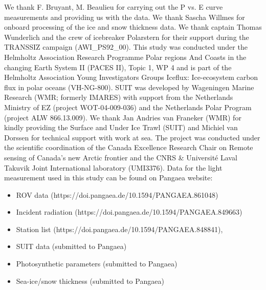 \documentclass[draft]{agujournal2018}
\begin{document}
%
%
%
%
%
%
%
%

\acknowledgments

We thank F. Bruyant, M. Beaulieu for carrying out the P vs. E curve measurements and providing us with the data. We thank Sascha Willmes for onboard processing of the ice and snow thickness data. We thank captain Thomas Wunderlich and the crew of icebreaker Polarstern for their support during the TRANSSIZ campaign (AWI\_PS92\_00). This study was conducted under the Helmholtz Association Research Programme Polar regions And Coasts in the changing Earth System II (PACES II), Topic 1, WP 4 and is part of the Helmholtz Association Young Investigators Groups Iceflux: Ice-ecosystem carbon flux in polar oceans (VH-NG-800). SUIT was developed by Wageningen Marine Research (WMR; formerly IMARES) with support from the Netherlands Ministry of EZ (project WOT-04-009-036) and the Netherlands Polar Program (project ALW 866.13.009). We thank Jan Andries van Franeker (WMR) for kindly providing the Surface and Under Ice Trawl (SUIT) and Michiel van Dorssen for technical support with work at sea. The project was conducted under the scientific coordination of the Canada Excellence Research Chair on Remote sensing of Canada's new Arctic frontier and the CNRS \& Université Laval Takuvik Joint International laboratory (UMI3376). Data for the light measurement used in this study can be found on Pangaea website: 

\begin{itemize}
	\item ROV data (https://doi.pangaea.de/10.1594/PANGAEA.861048)
	\item Incident radiation (https://doi.pangaea.de/10.1594/PANGAEA.849663)
	\item Station list (https://doi.pangaea.de/10.1594/PANGAEA.848841), 
	\item SUIT data (submitted to Pangaea)
	\item Photosynthetic parameters (submitted to Pangaea)
	\item Sea-ice/snow thickness (submitted to Pangaea)
\end{itemize}
\end{document}
